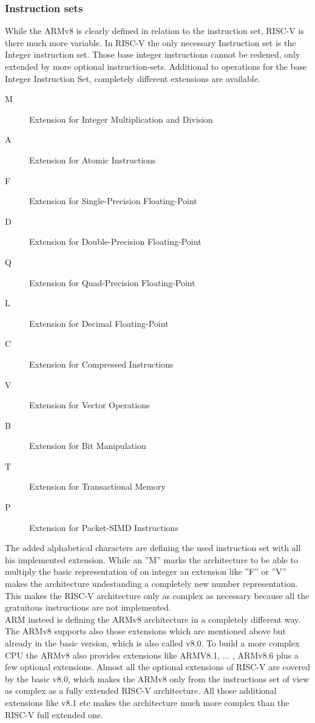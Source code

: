 \documentclass[conference]{IEEEtran}
\begin{document}
	\subsubsection{Instruction sets}
	While the ARMv8 is clearly defined in relation to the instruction set, RISC-V is there much more variable. In RISC-V the only necessary Instruction set is the Integer instruction set. Those base integer instructions cannot be redened, only extended by more optional instruction-sets. Additional to operations for the base Integer Instruction Set, completely different extensions are available.
	\begin{description}
	\item[M]	Extension for Integer Multiplication and Division
	\item[A]	Extension for Atomic Instructions
	\item[F]	Extension for Single-Precision Floating-Point
	\item[D]	Extension for Double-Precision Floating-Point
	\item[Q]	Extension for Quad-Precision Floating-Point
	\item[L]	Extension for Decimal Floating-Point
	\item[C] 	Extension for Compressed Instructions
	\item[V]	Extension for Vector Operations
	\item[B]	Extension for Bit Manipulation
	\item[T]	Extension for Transactional Memory
	\item[P]	Extension for Packet-SIMD Instructions
	\end{description}
The added alphabetical characters are defining the used instruction set with all his implemented extension. While an ''M'' marks the architecture to be able to multiply the basic representation of on integer an extension like ''F'' or ''V'' makes the architecture undestanding a completely new number representation. This makes the RISC-V architecture only as complex as necessary because all the gratuitous instructions are not implemented. \cite{Asanovic2016} \\
ARM insteed is defining the ARMv8 architecture in a completely different way. The ARMv8 supports also those extensions which are mentioned above but already in the basic version, which is also called v8.0. To build a more complex CPU the ARMv8 also provides extensions like ARMV8.1, ... , ARMv8.6 plus a few optional extensions.  Almost all the optional extensions of RISC-V are covered by the basic v8.0, which makes the ARMv8 only from the instructions set of view as complex as a fully extended RISC-V architecture. All those additional extensions like v8.1 etc makes the architecture much more complex than the RISC-V full extended one. \cite{ArmManual} \\
\end{document}
